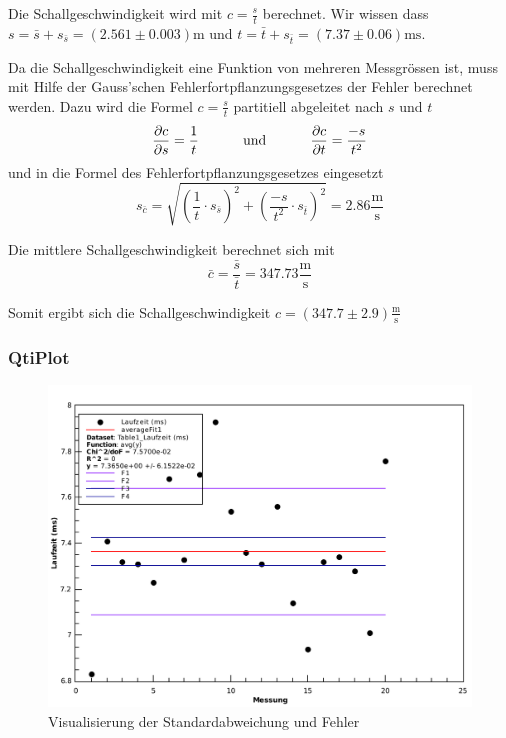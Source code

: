 Die Schallgeschwindigkeit wird mit $c=\frac{s}{t}$ berechnet. Wir wissen dass
$s=\bar{s}+s_{\bar{s}}=(2.561\pm0.003) \textrm{m}$
und
$t=\bar{t}+s_{\bar{t}}=(7.37\pm0.06) \textrm{ms}$.

Da die Schallgeschwindigkeit eine Funktion von mehreren Messgr\"ossen ist, muss mit Hilfe der
Gauss'schen Fehlerfortpflanzungsgesetzes der Fehler berechnet werden. Dazu wird die Formel $c=\frac{s}{t}$
partitiell abgeleitet nach $s$ und $t$
\[ \frac{\partial c}{\partial s} = \frac{1}{t} \textrm{\hspace{10mm} und \hspace{10mm}} \frac{\partial c}{\partial{t}} = \frac{-s}{t^2} \]
und in die Formel des Fehlerfortpflanzungsgesetzes eingesetzt
\[ s_{\bar{c}} = \sqrt{(\frac{1}{t} \cdot s_{\bar{s}})^2 + (\frac{-s}{t^2} \cdot s_{\bar{t}})^2} = 2.86 \frac{\textrm{m}}{\textrm{s}} \]

Die mittlere Schallgeschwindigkeit berechnet sich mit
\[ \bar{c}=\frac{\bar{s}}{\bar{t}} = 347.73 \frac{\textrm{m}}{\textrm{s}} \]

Somit ergibt sich die Schallgeschwindigkeit
\underline{\underline{$c=(347.7 \pm 2.9) \frac{\textrm{m}}{\textrm{s}}$}}


\subsubsection*{QtiPlot}

\begin{figure}[H]
    \center
    \includegraphics[width=.85\textwidth]{qtiplot/schallgeschwindigkeit}
    \caption{Visualisierung der Standardabweichung und Fehler}
    \label{fig:schallgeschwindigkeit}
\end{figure}

